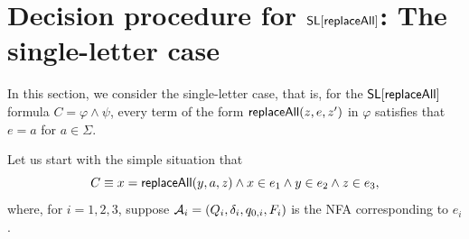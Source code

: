 

\section{Decision procedure for $\mathsf{SL}[\mathsf{replaceAll}]$: The single-letter case} \label{sec:replaceallsl}








In this section, we consider the single-letter case, that is, for the $\mathsf{SL}[\mathsf{replaceAll}]$ formula $C = \varphi \wedge \psi$, every term of the form $\mathsf{replaceAll}(z, e, z')$ in $\varphi$ satisfies that $e=a$ for $a \in \Sigma$.



Let us start with the simple situation that 
\[C \equiv x = \mathsf{replaceAll}(y, a, z) \wedge x \in e_1 \wedge y \in e_2 \wedge z \in e_3,\]  
where, for $i =1, 2, 3$, suppose  $\mathcal{A}_i = (Q_i, \delta_i, q_{0,i}, F_i)$ 
is the NFA corresponding to $e_i$. 

